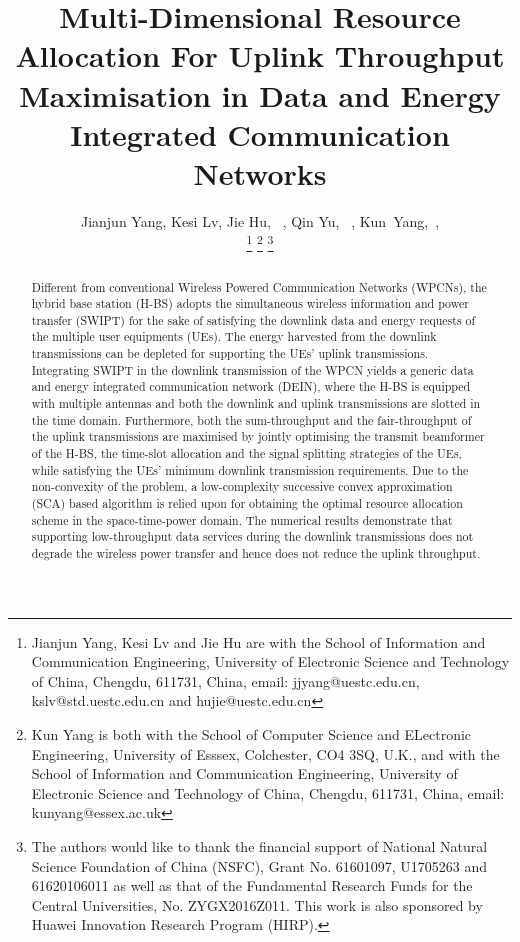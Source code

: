 \documentclass[12pt,draftcls,onecolumn,journal]{IEEEtran}
\begin{document}
\title{Multi-Dimensional Resource Allocation For Uplink Throughput Maximisation in Data and Energy Integrated Communication Networks}

\author{Jianjun Yang, Kesi Lv, Jie Hu, ~, Qin Yu, ~, Kun~Yang,~, 
        
\thanks{Jianjun Yang, Kesi Lv and Jie Hu are with the School of Information and Communication Engineering, University of Electronic Science and Technology of China, Chengdu, 611731, China, email: jjyang@uestc.edu.cn, kslv@std.uestc.edu.cn and hujie@uestc.edu.cn}
\thanks{Kun Yang is both with the School of Computer Science and ELectronic Engineering, University of Esssex, Colchester, CO4 3SQ, U.K., and with the School of Information and Communication Engineering, University of Electronic Science and Technology of China, Chengdu, 611731, China, email: kunyang@essex.ac.uk}
\thanks{The authors would like to thank the financial support of National Natural Science Foundation of China (NSFC), Grant No. 61601097, U1705263 and 61620106011 as well as that of the Fundamental Research Funds for the Central Universities, No. ZYGX2016Z011. This work is also sponsored by Huawei Innovation Research Program (HIRP).}}

\maketitle

\begin{abstract}
	Different from conventional Wireless Powered Communication Networks (WPCNs), the hybrid base station (H-BS) adopts the simultaneous wireless information and power transfer (SWIPT) for the sake of satisfying the downlink data and energy requests of the multiple user equipments (UEs). The energy harvested from the downlink transmissions can be depleted for supporting the UEs' uplink transmissions. Integrating SWIPT in the downlink transmission of the WPCN yields a generic data and energy integrated communication network (DEIN), where the H-BS is equipped with multiple antennas and both the downlink and uplink transmissions are slotted in the time domain. Furthermore, both the sum-throughput and the fair-throughput of the uplink transmissions are maximised by jointly optimising the transmit beamformer of the H-BS, the time-slot allocation and the signal splitting strategies of the UEs, while satisfying the UEs' minimum downlink transmission requirements. Due to the non-convexity of the problem, a low-complexity successive convex approximation (SCA) based algorithm is relied upon for obtaining the optimal resource allocation scheme in the space-time-power domain. The numerical results demonstrate that supporting low-throughput data services during the downlink transmissions does not degrade the wireless power transfer and hence does not reduce the uplink throughput.
\end{abstract}
\end{document}
